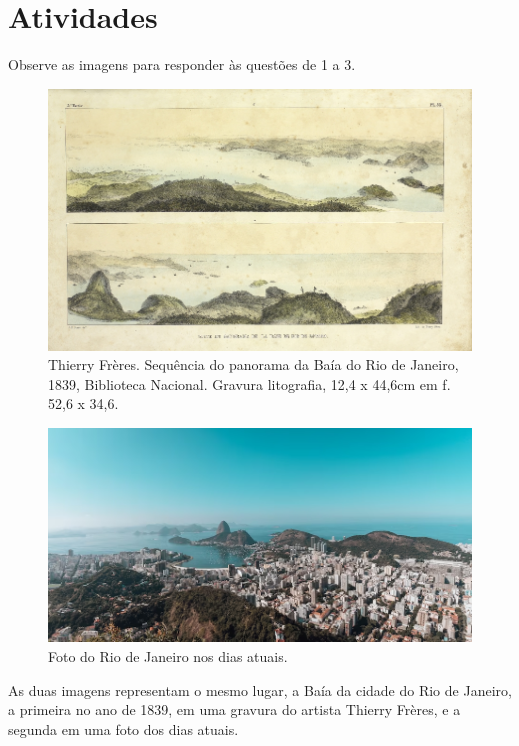 
\section{Atividades}


Observe as imagens para responder às questões de 1 a 3.

\begin{figure}[htpb!]
\includegraphics[width=\textwidth]{./imgs/img29.jpg}
\caption{Thierry Frères. Sequência do panorama da Baía do Rio de Janeiro, 1839, Biblioteca Nacional. Gravura litografia, 12,4 x 44,6cm em f. 52,6 x 34,6.}
\end{figure}

\begin{figure}[htpb!]
\includegraphics[width=\textwidth]{./imgs/img30.png}
\caption{Foto do Rio de Janeiro nos dias atuais.}
\end{figure}


\noindent{}As duas imagens representam o mesmo lugar, a Baía da cidade do Rio de
Janeiro, a primeira no ano de 1839, em uma gravura do artista Thierry
Frères, e a segunda em uma foto dos dias atuais.

